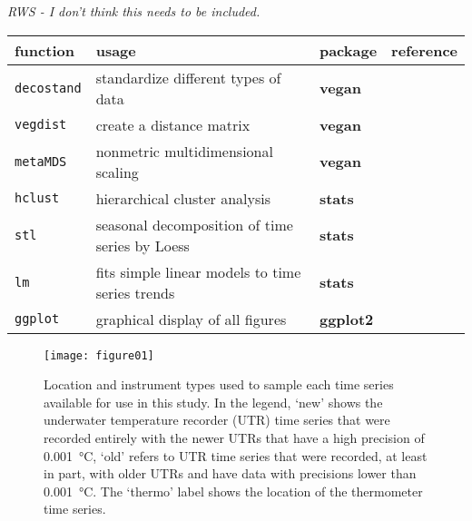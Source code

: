 \documentclass{ametsoc}
\begin{document}
\emph{RWS - I don't think this needs to be included.}
\begin{table}[ht]
\label{function-table}
\centering
\small
\begin{tabular}{llll}
\hline
function & usage & package & reference \\
 \hline
 \texttt{decostand} & standardize different types of data & \textbf{vegan} & \citet{vegan}\\
 \texttt{vegdist} & create a distance matrix & \textbf{vegan} & \citet{vegan}\\
 \texttt{metaMDS} & nonmetric multidimensional scaling & \textbf{vegan} & \citet{vegan}\\
 \texttt{hclust} & hierarchical cluster analysis & \textbf{stats} & \citet{R}\\
 \texttt{stl} & seasonal decomposition of time series by Loess & \textbf{stats} & \citet{R}\\
 \texttt{lm} & fits simple linear models to time series trends & \textbf{stats} & \citet{R}\\
 \texttt{ggplot} & graphical display of all figures & \textbf{ggplot2} & \citet{ggplot2}\\
  \hline
  \end{tabular}
\end{table}

%
\begin{figure}
\centering \texttt{[image: figure01]}
\caption[\small Location and instrument types used to sample each time series available for use in this study]{Location and instrument types used to sample each time series available for use in this study. In the legend, `new' shows the underwater temperature recorder (UTR) time series that were recorded entirely with the newer UTRs that have a high precision of \SI{0.001}{\degreeCelsius}, `old' refers to UTR time series that were recorded, at least in part, with older UTRs and have data with precisions lower than \SI{0.001}{\degreeCelsius}. The `thermo' label shows the location of the thermometer time series.}
\label{figure01}
\end{figure}
\end{document}
